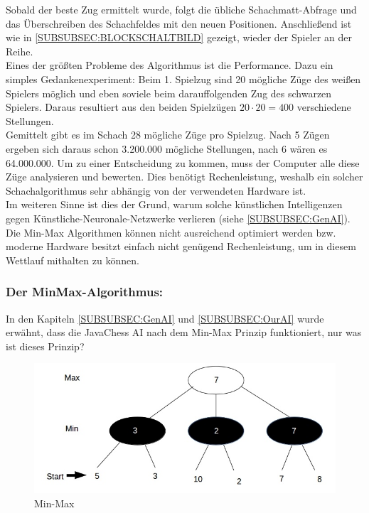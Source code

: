 \documentclass[12pt,a4paper]{article}
\begin{document}
{Sobald der beste Zug ermittelt wurde, folgt die übliche Schachmatt-Abfrage und das Überschreiben des Schachfeldes mit den neuen Positionen. Anschließend ist wie in \ref{SUBSUBSEC:BLOCKSCHALTBILD} gezeigt, wieder der Spieler an der Reihe. \\[2ex]
Eines der größten Probleme des Algorithmus ist die Performance. Dazu ein simples Gedankenexperiment: Beim 1. Spielzug sind 20 mögliche Züge des weißen Spielers möglich und eben soviele beim darauffolgenden Zug des schwarzen Spielers. Daraus resultiert aus den beiden Spielzügen \(20 \cdot 20 = 400\) verschiedene Stellungen. \\
Gemittelt gibt es im Schach 28 mögliche Züge pro Spielzug. Nach 5 Zügen ergeben sich daraus schon 3.200.000 mögliche Stellungen, nach 6 wären es 64.000.000. Um zu einer Entscheidung zu kommen, muss der Computer alle diese Züge analysieren und bewerten. Dies benötigt Rechenleistung, weshalb ein solcher Schachalgorithmus sehr abhängig von der verwendeten Hardware ist. \\
Im weiteren Sinne ist dies der Grund, warum solche künstlichen Intelligenzen gegen Künstliche-Neuronale-Netzwerke verlieren (siehe \ref{SUBSUBSEC:GenAI}). Die Min-Max Algorithmen können nicht ausreichend optimiert werden bzw. moderne Hardware besitzt einfach nicht genügend Rechenleistung, um in diesem Wettlauf mithalten zu können. \\

\subsubsection{Der MinMax-Algorithmus:}
\label{SUBSUBSEC:MinMax}

In den Kapiteln \ref{SUBSUBSEC:GenAI} und \ref{SUBSUBSEC:OurAI} wurde erwähnt, dass die JavaChess AI nach dem Min-Max Prinzip funktioniert, nur was ist dieses Prinzip?

\begin{figure}[H]
  \centering
   	\includegraphics[width=16cm]{graphics/MinMax.jpg}
  \caption{Min-Max}
  \label{FIG:MINMAX}
\end{figure}


}
\end{document}
